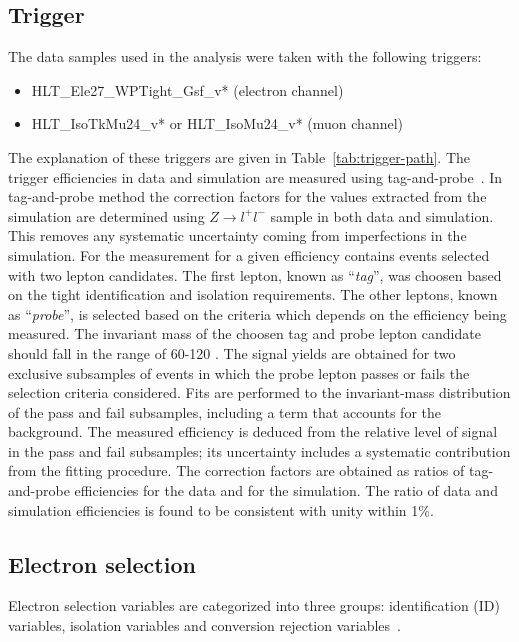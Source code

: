 \subsection{Trigger}
\label{subsec:trigger}
The data samples used in the analysis were taken with the following triggers:
\begin{itemize}
\item HLT\_Ele27\_WPTight\_Gsf\_v* (electron channel)
\item HLT\_IsoTkMu24\_v* or  HLT\_IsoMu24\_v* (muon channel)
\end{itemize}
The explanation of these triggers are given in Table~\ref{tab:trigger-path}. The trigger efficiencies in data and simulation are measured using tag-and-probe~\cite{Tag_probe}. In tag-and-probe method the correction factors  for the values extracted from the simulation are determined using $Z \rightarrow l^+ l^-$ sample in both data and simulation. This removes any systematic uncertainty coming from imperfections in the simulation. For the measurement for a given efficiency contains events selected with two lepton candidates. The first lepton, known as ``\textit{tag}'', was choosen based on the tight identification and isolation requirements. The other leptons, known as ``\textit{probe}'', is selected based on the criteria which depends on the efficiency being measured. The invariant mass of the choosen tag and probe lepton candidate should fall in the range of 60-120 \GeV. The signal yields are obtained for two exclusive subsamples of events in which the probe lepton passes or fails the selection criteria considered. Fits are performed to the invariant-mass distribution of the pass and fail subsamples, including a term that accounts for the background. The measured efficiency is deduced from the relative level of signal in the pass and fail subsamples; its uncertainty includes a systematic contribution from the fitting procedure. The correction factors are obtained as ratios of tag-and-probe efficiencies for the data and for the simulation. The ratio of data and simulation efficiencies is found to be consistent with unity within 1\%.


\subsection{Electron selection}
\label{subsec:electrons}
Electron selection variables are categorized into three groups: identification (ID) variables, isolation variables and conversion rejection variables~\cite{ElectronReconstruction_8TeV_cms,Novakova2013}.


